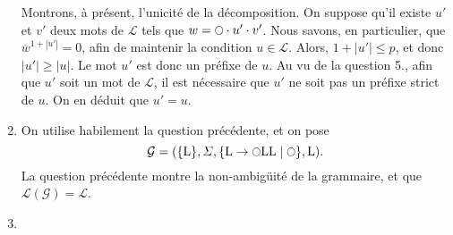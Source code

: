\begin{enumerate}
		Montrons, à présent, l'unicité de la décomposition.
		On suppose qu'il existe $u'$ et $v'$ deux mots de $\mathcal{L}$ tels que $w = \circle \cdot u' \cdot v'$.
		Nous savons, en particulier, que $\overline w^{1+|u'|} = 0$, afin de maintenir la condition $u \in \mathcal{L}$.
		Alors, $1 + |u'| \le p$, et donc $|u'| \ge |u|$. Le mot $u'$ est donc un préfixe de $u$.
		Au vu de la question 5., afin que $u'$ soit un mot de $\mathcal{L}$, il est nécessaire que $u'$ ne soit pas un préfixe strict de $u$. On en déduit que $u' = u$.
	\item On utilise habilement la question précédente, et on pose \[
			\mathcal{G} = (\{\mathrm{L}\}, \Sigma, \{\mathrm{L} \to \circle \mathrm{LL} \mid \circle \}, \mathrm{L})
		.\]
		La question précédente montre la non-ambigüité de la grammaire, et que $\mathcal{L}(\mathcal{G}) = \mathcal{L}$.
	\item 
\end{enumerate}
